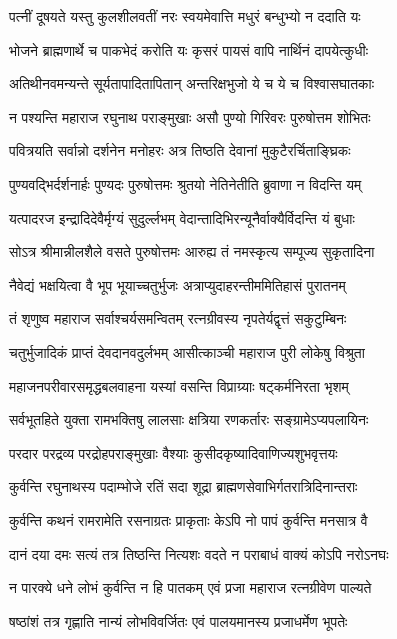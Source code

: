\twolineshloka
{पत्नीं दूषयते यस्तु कुलशीलवतीं नरः}
{स्वयमेवात्ति मधुरं बन्धुभ्यो न ददाति यः}%

\twolineshloka
{भोजने ब्राह्मणार्थे च पाकभेदं करोति यः}
{कृसरं पायसं वापि नार्थिनं दापयेत्कुधीः}%

\twolineshloka
{अतिथीनवमन्यन्ते सूर्यतापादितापितान्}
{अन्तरिक्षभुजो ये च ये च विश्वासघातकाः}%

\twolineshloka
{न पश्यन्ति महाराज रघुनाथ पराङ्मुखाः}
{असौ पुण्यो गिरिवरः पुरुषोत्तम शोभितः}%

\twolineshloka
{पवित्रयति सर्वान्नो दर्शनेन मनोहरः}
{अत्र तिष्ठति देवानां मुकुटैरर्चिताङ्घ्रिकः}%

\twolineshloka
{पुण्यवद्भिर्दर्शनार्हः पुण्यदः पुरुषोत्तमः}
{श्रुतयो नेतिनेतीति ब्रुवाणा न विदन्ति यम्}%

\twolineshloka
{यत्पादरज इन्द्रादिदेवैर्मृग्यं सुदुर्ल्लभम्}
{वेदान्तादिभिरन्यूनैर्वाक्यैर्विदन्ति यं बुधाः}%

\twolineshloka
{सोऽत्र श्रीमान्नीलशैले वसते पुरुषोत्तमः}
{आरुह्य तं नमस्कृत्य सम्पूज्य सुकृतादिना}%

\twolineshloka
{नैवेद्यं भक्षयित्वा वै भूप भूयाच्चतुर्भुजः}
{अत्राप्युदाहरन्तीममितिहासं पुरातनम्}%

\twolineshloka
{तं शृणुष्व महाराज सर्वाश्चर्यसमन्वितम्}
{रत्नग्रीवस्य नृपतेर्यद्वृत्तं सकुटुम्बिनः}%

\twolineshloka
{चतुर्भुजादिकं प्राप्तं देवदानवदुर्लभम्}
{आसीत्काञ्ची महाराज पुरी लोकेषु विश्रुता}%

\twolineshloka
{महाजनपरीवारसमृद्धबलवाहना}
{यस्यां वसन्ति विप्राग्र्याः षट्कर्मनिरता भृशम्}%

\twolineshloka
{सर्वभूतहिते युक्ता रामभक्तिषु लालसाः}
{क्षत्रिया रणकर्तारः सङ्ग्रामेऽप्यपलायिनः}%

\twolineshloka
{परदार परद्रव्य परद्रोहपराङ्मुखाः}
{वैश्याः कुसीदकृष्यादिवाणिज्यशुभवृत्तयः}%

\twolineshloka
{कुर्वन्ति रघुनाथस्य पदाम्भोजे रतिं सदा}
{शूद्रा ब्राह्मणसेवाभिर्गतरात्रिदिनान्तराः}%

\twolineshloka
{कुर्वन्ति कथनं रामरामेति रसनाग्रतः}
{प्राकृताः केऽपि नो पापं कुर्वन्ति मनसात्र वै}%

\twolineshloka
{दानं दया दमः सत्यं तत्र तिष्ठन्ति नित्यशः}
{वदते न पराबाधं वाक्यं कोऽपि नरोऽनघः}%

\twolineshloka
{न पारक्ये धने लोभं कुर्वन्ति न हि पातकम्}
{एवं प्रजा महाराज रत्नग्रीवेण पाल्यते}%

\twolineshloka
{षष्ठांशं तत्र गृह्णाति नान्यं लोभविवर्जितः}
{एवं पालयमानस्य प्रजाधर्मेण भूपतेः}%

